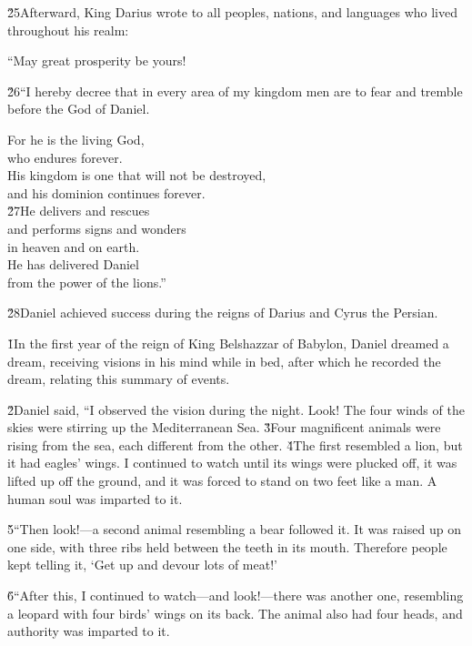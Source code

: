 \v{25}Afterward, King Darius wrote to all peoples, nations, and languages who lived throughout his realm:

``May great prosperity be yours!

\v{26}``I hereby decree that in every area of my kingdom men are to fear and tremble before the God of Daniel.

\begin{poetry}
\poeml For he is the living God, \\
\poemll    who endures forever. \\
\poeml His kingdom is one that will not be destroyed, \\
\poemll    and his dominion continues forever. \\
\poeml \v{27}He delivers and rescues \\
\poemll    and performs signs and wonders \\
\poemlll       in heaven and on earth. \\
\poeml He has delivered Daniel \\
\poemll    from the power of the lions.''
\end{poetry}

\v{28}Daniel achieved success during the reigns of Darius and Cyrus the Persian.

\v{1}In the first year of the reign of King Belshazzar of Babylon, Daniel dreamed a dream, receiving visions in his mind while in bed, after which he recorded the dream, relating this summary of events.

\v{2}Daniel said, ``I observed the vision during the night. Look! The four winds of the skies were stirring up the Mediterranean Sea. \v{3}Four magnificent animals were rising from the sea, each different from the other. \v{4}The first resembled a lion, but it had eagles' wings. I continued to watch until its wings were plucked off, it was lifted up off the ground, and it was forced to stand on two feet like a man. A human soul was imparted to it.

\v{5}``Then look!---a second animal resembling a bear followed it. It was raised up on one side, with three ribs held between the teeth in its mouth. Therefore people kept telling it, `Get up and devour lots of meat!'

\v{6}``After this, I continued to watch---and look!---there was another one, resembling a leopard with four birds' wings on its back. The animal also had four heads, and authority was imparted to it.

